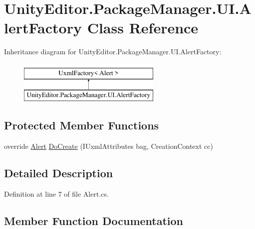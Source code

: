 \hypertarget{class_unity_editor_1_1_package_manager_1_1_u_i_1_1_alert_factory}{}\section{Unity\+Editor.\+Package\+Manager.\+U\+I.\+Alert\+Factory Class Reference}
\label{class_unity_editor_1_1_package_manager_1_1_u_i_1_1_alert_factory}
Inheritance diagram for Unity\+Editor.\+Package\+Manager.\+U\+I.\+Alert\+Factory\+:\begin{figure}[H]
\begin{center}
\leavevmode
\includegraphics[height=2.000000cm]{class_unity_editor_1_1_package_manager_1_1_u_i_1_1_alert_factory}
\end{center}
\end{figure}
\subsection*{Protected Member Functions}
\begin{DoxyCompactItemize}
\item 
override \mbox{\hyperlink{class_unity_editor_1_1_package_manager_1_1_u_i_1_1_alert}{Alert}} \mbox{\hyperlink{class_unity_editor_1_1_package_manager_1_1_u_i_1_1_alert_factory_a1cc881633bf3ccf6929d728f510c380e}{Do\+Create}} (I\+Uxml\+Attributes bag, Creation\+Context cc)
\end{DoxyCompactItemize}


\subsection{Detailed Description}


Definition at line 7 of file Alert.\+cs.



\subsection{Member Function Documentation}
\mbox{\label{class_unity_editor_1_1_package_manager_1_1_u_i_1_1_alert_factory_a1cc881633bf3ccf6929d728f510c380e}} 
